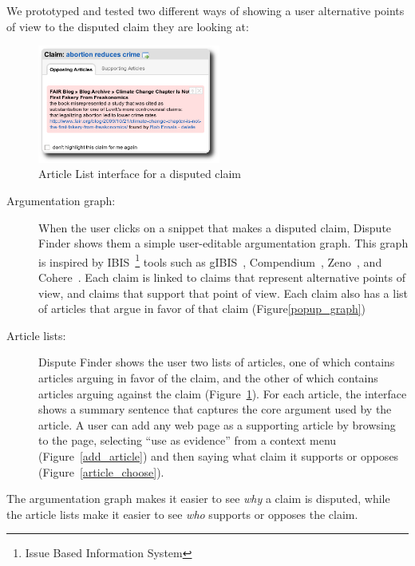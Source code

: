 \documentclass{www2010-submission}
\begin{document}
We prototyped and tested two different ways of showing a user alternative points of view to the disputed claim they are looking at:

\begin{figure}[tb]
	\begin{center}
	\includegraphics[width=6cm]{pictures/popup_abortion_shadow.png}
	\caption{Article List interface for a disputed claim}
	\label{article_list}
	\end{center}
\end{figure}



\begin{description}
\item[Argumentation graph:] When the user clicks on a snippet that makes a disputed claim, Dispute Finder shows them a simple user-editable argumentation graph. This graph is inspired by IBIS~\footnote{Issue Based Information System} tools such as gIBIS~\cite{Conklin1987a}, Compendium~\cite{Selvin2001}, Zeno~\cite{Gordon1997}, and Cohere~\cite{Shum2008}. Each claim is linked to claims that represent alternative points of view, and claims that support that point of view. Each claim also has a list of articles that argue in favor of that claim (Figure\ref{popup_graph})

\item[Article lists:] Dispute Finder shows the user two lists of articles, one of which contains articles arguing in favor of the claim, and the other of which contains articles arguing against the claim (Figure~\ref{article_list}). For each article, the interface shows a summary sentence that captures the core argument used by the article. A user can add any web page as a supporting article by browsing to the page, selecting ``use as evidence'' from a context menu (Figure~\ref{add_article}) and then saying what claim it supports or opposes (Figure~\ref{article_choose}).
\end{description}

The argumentation graph makes it easier to see {\it why} a claim is disputed, while the article lists make it easier to see {\it who} supports or opposes the claim. 
\end{document}
